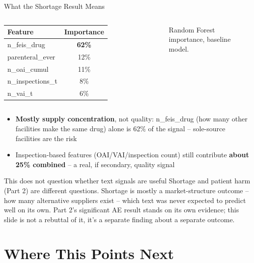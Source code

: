 \documentclass[aspectratio=169,10pt]{beamer}
\newcommand{\highlight}[1]{{\color{ncsuRed}\textbf{#1}}}
\begin{document}
\begin{frame}{What the Shortage Result Means}
\begin{columns}[T]
{\small
\begin{tabular}{lc}
\toprule
Feature & Importance \\
\midrule
n\_feis\_drug & \highlight{62\%} \\
parenteral\_ever & 12\% \\
n\_oai\_cumul & 11\% \\
n\_inspections\_t & 8\% \\
n\_vai\_t & 6\% \\
\bottomrule
\end{tabular}
}
{\small Random Forest importance, baseline model.}
\end{columns}
\vspace{10pt}
\begin{itemize}
  \setlength{\itemsep}{7pt}
  \item \highlight{Mostly supply concentration}, not quality: n\_feis\_drug
        (how many other facilities make the same drug) alone is 62\% of the
        signal -- sole-source facilities are the risk
  \item Inspection-based features (OAI/VAI/inspection count) still contribute
        \highlight{about 25\% combined} -- a real, if secondary, quality signal
\end{itemize}
\vspace{8pt}
\begin{alertblock}{This does not question whether text signals are useful}
\small Shortage and patient harm (Part 2) are different questions. Shortage is
mostly a market-structure outcome -- how many alternative suppliers exist --
which text was never expected to predict well on its own. Part 2's
significant AE result stands on its own evidence; this slide is not a
rebuttal of it, it's a separate finding about a separate outcome.
\end{alertblock}
\end{frame}

\section{Where This Points Next}
\end{document}
